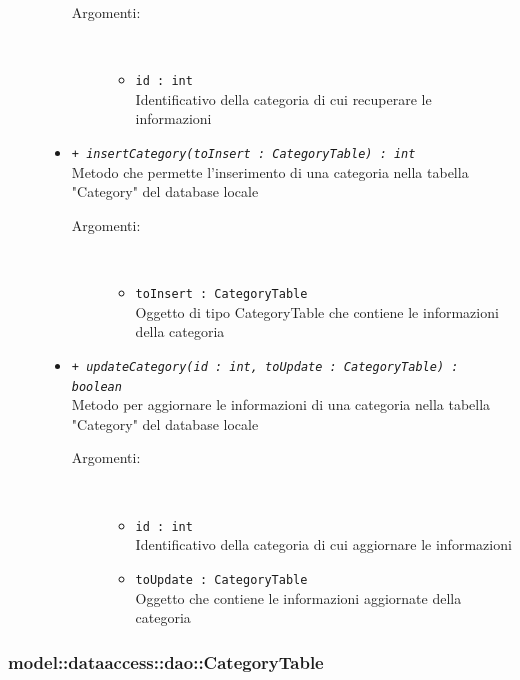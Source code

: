 \documentclass[../DefinizioneDiProdotto.tex]{subfiles}
\begin{document}
\begin{description}
\begin{itemize}
\begin{description}
\item[Argomenti:] \
\begin{itemize}
\item \texttt{id : int}\\
Identificativo della categoria di cui recuperare le informazioni\end{itemize}
\end{description}
\item \texttt{+ \textit{insertCategory(toInsert : CategoryTable) : int}}\\
Metodo che permette l'inserimento di una categoria nella tabella "Category" del database locale
 \begin{description}
\item[Argomenti:] \
\begin{itemize}
\item \texttt{toInsert : CategoryTable}\\
Oggetto di tipo CategoryTable che contiene le informazioni della categoria\end{itemize}
\end{description}
\item \texttt{+ \textit{updateCategory(id : int, toUpdate : CategoryTable) : boolean}}\\
Metodo per aggiornare le informazioni di una categoria nella tabella "Category" del database locale
 \begin{description}
\item[Argomenti:] \
\begin{itemize}
\item \texttt{id : int}\\
Identificativo della categoria di cui aggiornare le informazioni\item \texttt{toUpdate : CategoryTable}\\
Oggetto che contiene le informazioni aggiornate della categoria\end{itemize}
\end{description}
\end{itemize}
\end{description}

\subsubsection{model::dataaccess::dao::CategoryTable}
\end{document}
